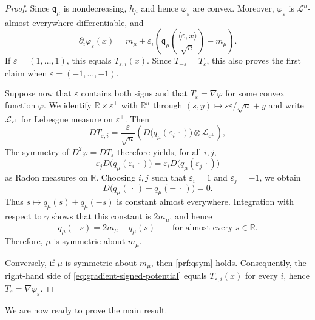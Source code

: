 \documentclass[11pt]{amsart}
\theoremstyle{definition}
\newcommand{\R}{\mathbb{R}}
\newcommand{\qmu}{\mathsf q_{\mu}}
\begin{document}
\begin{proof}
Since $\qmu$ is nondecreasing, $h_\mu$ and hence
$\varphi_\varepsilon$ are convex. Moreover, $\varphi_\varepsilon$ is $\mathcal L^n$-almost everywhere differentiable, and
\begin{equation}\label{eq:gradient-signed-potential}
  \partial_i\varphi_\varepsilon(x)
  =
  m_\mu
  +
  \varepsilon_i\left(
    \qmu\left(\frac{\langle\varepsilon,x\rangle}{\sqrt n}\right)
    -m_\mu
  \right).
\end{equation}
If $\varepsilon=(1,\ldots,1)$, this equals
$T_{\varepsilon,i}(x)$. Since
$T_{-\varepsilon}=T_\varepsilon$, this also proves the first claim
when $\varepsilon=(-1,\ldots,-1)$.

Suppose now that $\varepsilon$ contains both signs and that
$T_\varepsilon=\nabla\varphi$ for some convex function $\varphi$. We
identify $\R\times\varepsilon^\perp$ with $\R^n$ through
$(s,y)\mapsto s\varepsilon/\sqrt n+y$ and write
$\mathcal L_{\varepsilon^\perp}$ for Lebesgue measure on
$\varepsilon^\perp$. Then
\[
  DT_{\varepsilon,i}
  =
  \frac{\varepsilon}{\sqrt n}
  \left(
    D\bigl(q_\mu(\varepsilon_i\,\cdot)\bigr)
    \otimes\mathcal L_{\varepsilon^\perp}
  \right),
\]
The symmetry of $D^2\varphi=DT_\varepsilon$ therefore yields, for all $i,j$,
\[
  \varepsilon_j
  D\bigl(q_\mu(\varepsilon_i\,\cdot)\bigr)
  =
  \varepsilon_i
  D\bigl(q_\mu(\varepsilon_j\,\cdot)\bigr)
\]
as Radon measures on $\R$.
Choosing $i,j$ such that $\varepsilon_i=1$ and
$\varepsilon_j=-1$, we obtain
\[
  D\bigl(q_\mu(\,\cdot\,)+q_\mu(-\,\cdot\,)\bigr)=0.
\]
Thus $s\mapsto q_\mu(s)+q_\mu(-s)$ is constant almost everywhere.
Integration with respect to $\gamma$ shows that this constant is
$2m_\mu$, and hence
\begin{equation}\label{prf:qsym}
  q_\mu(-s)=2m_\mu-q_\mu(s)
  \qquad\text{for almost every }s\in\R.
\end{equation}
Therefore, $\mu$ is symmetric about $m_\mu$.

Conversely, if $\mu$ is symmetric about $m_\mu$, then \eqref{prf:qsym} holds. Consequently, the right-hand side of
\eqref{eq:gradient-signed-potential} equals
$T_{\varepsilon,i}(x)$ for every $i$, hence 
$T_\varepsilon=\nabla\varphi_\varepsilon$.
\end{proof}





We are now ready to prove the main result.
\end{document}
